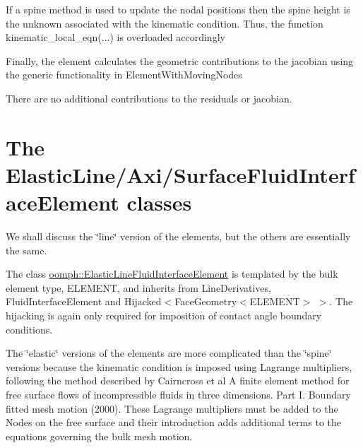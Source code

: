  
\begin{DoxyCodeInclude}

\end{DoxyCodeInclude}


If a spine method is used to update the nodal positions then the spine height is the unknown associated with the kinematic condition. Thus, the function {\ttfamily kinematic\+\_\+local\+\_\+eqn}(...) is overloaded accordingly  
\begin{DoxyCodeInclude}

\end{DoxyCodeInclude}


Finally, the element calculates the geometric contributions to the jacobian using the generic functionality in {\ttfamily Element\+With\+Moving\+Nodes} 
\begin{DoxyCodeInclude}

\end{DoxyCodeInclude}


There are no additional contributions to the residuals or jacobian.



\hypertarget{index_elastic_formulation}{}\section{The Elastic\+Line/\+Axi/\+Surface\+Fluid\+Interface\+Element classes}\label{index_elastic_formulation}
We shall discuss the \char`\"{}line\char`\"{} version of the elements, but the others are essentially the same.

The class \hyperlink{classoomph_1_1ElasticLineFluidInterfaceElement}{oomph\+::\+Elastic\+Line\+Fluid\+Interface\+Element} is templated by the bulk element type, {\ttfamily E\+L\+E\+M\+E\+NT}, and inherits from {\ttfamily Line\+Derivatives}, Fluid\+Interface\+Element and {\ttfamily Hijacked$<$Face\+Geometry$<$\+E\+L\+E\+M\+E\+N\+T$>$} $>$. The hijacking is again only required for imposition of contact angle boundary conditions.

The \char`\"{}elastic\char`\"{} versions of the elements are more complicated than the \char`\"{}spine\char`\"{} versions because the kinematic condition is imposed using Lagrange multipliers, following the method described by Cairncross et al A finite element method for free surface flows of incompressible fluids in three dimensions. Part I. Boundary fitted mesh motion\textquotesingle{} (2000). These Lagrange multipliers must be added to the {\ttfamily Nodes} on the free surface and their introduction adds additional terms to the equations governing the bulk mesh motion.

